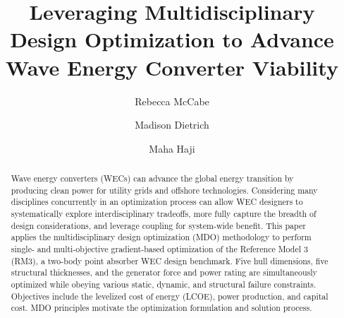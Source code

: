 \documentclass[preprint,12pt]{elsarticle}
\begin{document}

\begin{frontmatter}



\title{Leveraging Multidisciplinary Design Optimization to Advance Wave Energy Converter Viability}

\author[MAE]{Rebecca McCabe}
\author[MAE]{Madison Dietrich}
\author[mich]{Maha Haji}




\begin{abstract}
Wave energy converters (WECs) can advance the global energy transition by producing clean power for utility grids and offshore technologies.
Considering many disciplines concurrently in an optimization process can allow WEC designers to systematically explore interdisciplinary tradeoffs, more fully capture the breadth of design considerations, and leverage coupling for system-wide benefit.
This paper applies the multidisciplinary design optimization (MDO) methodology to perform single- and multi-objective gradient-based optimization of the Reference Model 3 (RM3), a two-body point absorber WEC design benchmark.
Five hull dimensions, five structural thicknesses, and the generator force and power rating are simultaneously optimized while obeying various static, dynamic, and structural failure constraints.
Objectives include the levelized cost of energy (LCOE), power production, and capital cost.
MDO principles motivate the optimization formulation and solution process.


\end{abstract}
\end{frontmatter}
\end{document}
